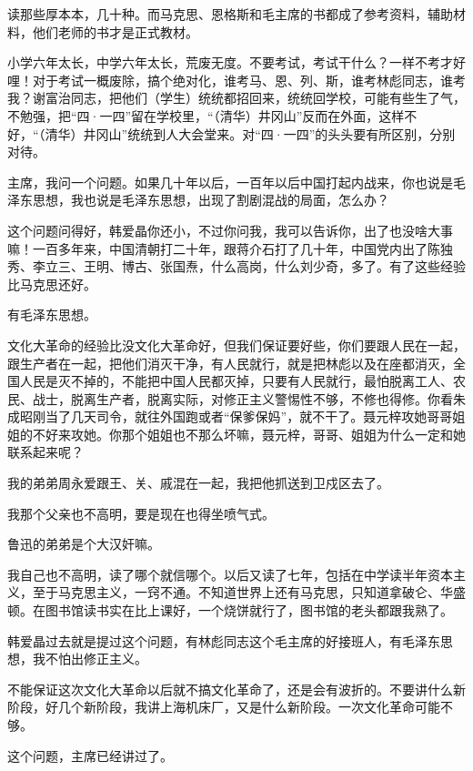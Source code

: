 读那些厚本本，几十种。而马克思、恩格斯和毛主席的书都成了参考资料，辅助材料，他们老师的书才是正式教材。

小学六年太长，中学六年太长，荒废无度。不要考试，考试干什么？一样不考才好哩！对于考试一概废除，搞个绝对化，谁考马、恩、列、斯，谁考林彪同志，谁考我？谢富治同志，把他们（学生）统统都招回来，统统回学校，可能有些生了气，不勉强，把“四·一四”留在学校里，“（清华）井冈山”反而在外面，这样不好，“（清华）井冈山”统统到人大会堂来。对“四·一四”的头头要有所区别，分别对待。

主席，我问一个问题。如果几十年以后，一百年以后中国打起内战来，你也说是毛泽东思想，我也说是毛泽东思想，出现了割剧混战的局面，怎么办？

这个问题问得好，韩爱晶你还小，不过你问我，我可以告诉你，出了也没啥大事嘛！一百多年来，中国清朝打二十年，跟蒋介石打了几十年，中国党内出了陈独秀、李立三、王明、博古、张国焘，什么高岗，什么刘少奇，多了。有了这些经验比马克思还好。

有毛泽东思想。

文化大革命的经验比没文化大革命好，但我们保证要好些，你们要跟人民在一起，跟生产者在一起，把他们消灭干净，有人民就行，就是把林彪以及在座都消灭，全国人民是灭不掉的，不能把中国人民都灭掉，只要有人民就行，最怕脱离工人、农民、战士，脱离生产者，脱离实际，对修正主义警惕性不够，不修也得修。你看朱成昭刚当了几天司令，就往外国跑或者“保爹保妈”，就不干了。聂元梓攻她哥哥姐姐的不好来攻她。你那个姐姐也不那么坏嘛，聂元梓，哥哥、姐姐为什么一定和她联系起来呢？

我的弟弟周永爱跟王、关、戚混在一起，我把他抓送到卫戍区去了。

我那个父亲也不高明，要是现在也得坐喷气式。

鲁迅的弟弟是个大汉奸嘛。

我自己也不高明，读了哪个就信哪个。以后又读了七年，包括在中学读半年资本主义，至于马克思主义，一窍不通。不知道世界上还有马克思，只知道拿破仑、华盛顿。在图书馆读书实在比上课好，一个烧饼就行了，图书馆的老头都跟我熟了。

韩爱晶过去就是提过这个问题，有林彪同志这个毛主席的好接班人，有毛泽东思想，我不怕出修正主义。

不能保证这次文化大革命以后就不搞文化革命了，还是会有波折的。不要讲什么新阶段，好几个新阶段，我讲上海机床厂，又是什么新阶段。一次文化革命可能不够。

这个问题，主席已经讲过了。

